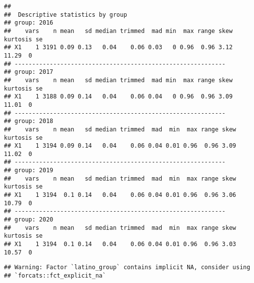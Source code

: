 \documentclass[
]{article}
\newenvironment{Shaded}{\begin{snugshade}}{\end{snugshade}}
\newcommand{\DataTypeTok}[1]{\textcolor[rgb]{0.13,0.29,0.53}{#1}}
\newcommand{\DecValTok}[1]{\textcolor[rgb]{0.00,0.00,0.81}{#1}}
\newcommand{\KeywordTok}[1]{\textcolor[rgb]{0.13,0.29,0.53}{\textbf{#1}}}
\newcommand{\NormalTok}[1]{#1}
\newcommand{\OperatorTok}[1]{\textcolor[rgb]{0.81,0.36,0.00}{\textbf{#1}}}
\newcommand{\StringTok}[1]{\textcolor[rgb]{0.31,0.60,0.02}{#1}}
\begin{document}
\begin{Shaded}
\end{Shaded}

\begin{verbatim}
## 
##  Descriptive statistics by group 
## group: 2016
##    vars    n mean   sd median trimmed  mad min  max range skew kurtosis se
## X1    1 3191 0.09 0.13   0.04    0.06 0.03   0 0.96  0.96 3.12    11.29  0
## ------------------------------------------------------------ 
## group: 2017
##    vars    n mean   sd median trimmed  mad min  max range skew kurtosis se
## X1    1 3188 0.09 0.14   0.04    0.06 0.04   0 0.96  0.96 3.09    11.01  0
## ------------------------------------------------------------ 
## group: 2018
##    vars    n mean   sd median trimmed  mad  min  max range skew kurtosis se
## X1    1 3194 0.09 0.14   0.04    0.06 0.04 0.01 0.96  0.96 3.09    11.02  0
## ------------------------------------------------------------ 
## group: 2019
##    vars    n mean   sd median trimmed  mad  min  max range skew kurtosis se
## X1    1 3194  0.1 0.14   0.04    0.06 0.04 0.01 0.96  0.96 3.06    10.79  0
## ------------------------------------------------------------ 
## group: 2020
##    vars    n mean   sd median trimmed  mad  min  max range skew kurtosis se
## X1    1 3194  0.1 0.14   0.04    0.06 0.04 0.01 0.96  0.96 3.03    10.57  0
\end{verbatim}

\begin{Shaded}
\end{Shaded}

\begin{verbatim}
## Warning: Factor `latino_group` contains implicit NA, consider using
## `forcats::fct_explicit_na`
\end{verbatim}
\end{document}
